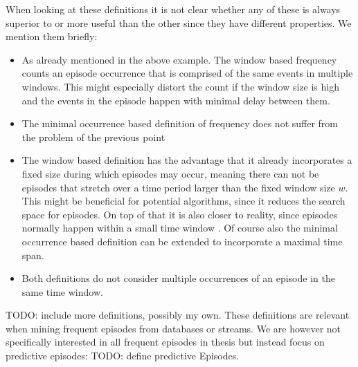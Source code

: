 When looking at these definitions it is not clear whether any of these is always superior to or more useful than the other since they have different properties. We mention them briefly:

\begin{itemize}
	\item As already mentioned in the above example. The window based frequency counts an episode occurrence that is comprised of the same events in multiple windows. This might especially distort the count if the window size is high and the events in the episode happen with minimal delay between them.
	\item The minimal occurrence based definition of frequency does not suffer from the problem of the previous point
	\item The window based definition has the advantage that it already incorporates a fixed size during which episodes may occur, meaning there can not be episodes that stretch over a time period larger than the fixed window size $w$. This might be beneficial for potential algorithms, since it reduces the search space for episodes. On top of that it is also closer to reality, since episodes normally happen within a small time window \cite{generatingEpisodeDatasets}. Of course also the minimal occurrence based definition can be extended to incorporate a maximal time span.
	\item Both definitions do not consider multiple occurrences of an episode in the same time window.
\end{itemize}

TODO: include more definitions, possibly my own. \newline \newline
These definitions are relevant when mining frequent episodes from databases or streams. We are however not specifically interested in all frequent episodes in thesis but instead focus on predictive episodes: TODO: define predictive Episodes.






